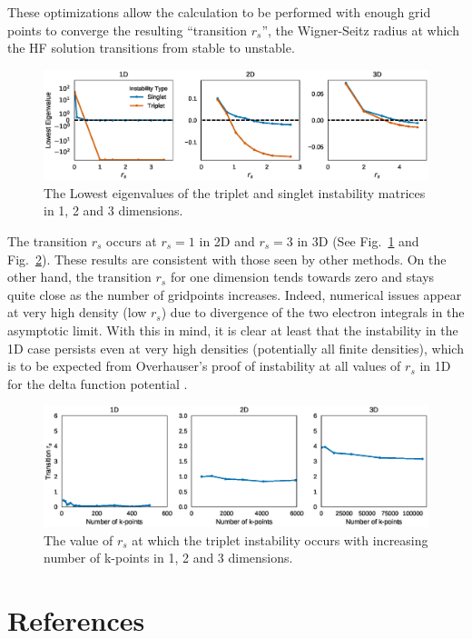 \documentclass{revtex4}
\begin{document}
     
     These optimizations allow the calculation to be performed with enough grid points to converge 
     the resulting ``transition $r_s$'', the Wigner-Seitz radius at which the HF solution 
     transitions 
     from stable to unstable.          
      \begin{figure}[H]
      \centering
        \includegraphics[width=\textwidth]{../figures/stability.eps}
        \caption{The Lowest eigenvalues of the triplet and singlet instability matrices in 1, 2 and
        3 dimensions.}
        \label{fig:stability}
      \end{figure}   
        
    The transition $r_s$ occurs at $r_s = 1$ in 2D and $r_s = 3$ in 3D (See 
    Fig.~\ref{fig:stability} and Fig.~\ref{fig:onset}). These 
    results are consistent with those seen by other methods\cite{Baguet2014, Bernu2011}. On 
    the other hand, the transition 
    $r_s$ for one dimension tends towards zero and stays quite close as the number of gridpoints 
    increases. Indeed, numerical issues appear at very high density (low $r_s$) due to divergence 
    of the two electron integrals in the asymptotic limit. With this in mind, it is clear at least 
    that the instability in the 1D case persists even at very high densities (potentially all 
    finite densities), which is to be expected from Overhauser's proof of instability at all 
    values of $r_s$ in 1D for the delta function potential \cite{Overhauser1962}.


    \begin{figure}[H]
    \centering
      \includegraphics[width=\textwidth]{../figures/triplet_onset.eps}
      \caption{The value of $r_s$ at which the triplet instability occurs with increasing number of 
      k-points in 1, 2 and 3 dimensions.}
      \label{fig:onset}
    \end{figure}
    
      
\newpage
\section{References}

\end{document}
